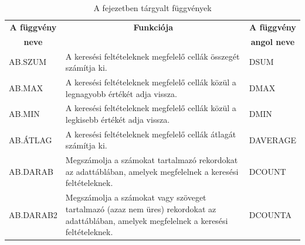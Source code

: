 \begin{table}[!h]
\begin{center}
\caption{A fejezetben tárgyalt függvények}\label{13-fejezetFüggvények}
\begin{tabular}{|m{3cm}|m{8cm}|m{3cm}|}
\hline
\multicolumn{1}{|c|}{\textbf{A függvény}}&
\multicolumn{1}{c|}{\textbf{Funkciója}}&
\multicolumn{1}{c|}{\textbf{A függvény}} \\
\multicolumn{1}{|c|}{\textbf{neve}} & &
\multicolumn{1}{c|}{\textbf{angol neve}} \\
\hline
AB.SZUM & A keresési feltételeknek megfelelő cellák összegét
számítja ki. & DSUM\\ \hline
AB.MAX & A keresési feltételeknek megfelelő cellák közül a
legnagyobb értékét adja vissza. & DMAX\\ \hline
AB.MIN & A keresési feltételeknek megfelelő cellák közül a
legkisebb értékét adja vissza. & DMIN\\ \hline
AB.ÁTLAG & A keresési feltételeknek megfelelő cellák átlagát
számítja ki. & DAVERAGE\\ \hline
AB.DARAB & Megszámolja a számokat tartalmazó rekordokat az adattáblában,
amelyek megfelelnek a keresési feltételeknek. & DCOUNT\\ \hline
AB.DARAB2 & Megszámolja a számokat vagy szöveget tartalmazó (azaz nem üres) rekordokat az
adattáblában, amelyek megfelelnek a keresési feltételeknek. &
DCOUNTA\\ \hline
\end{tabular}
\end{center}
\end{table}

